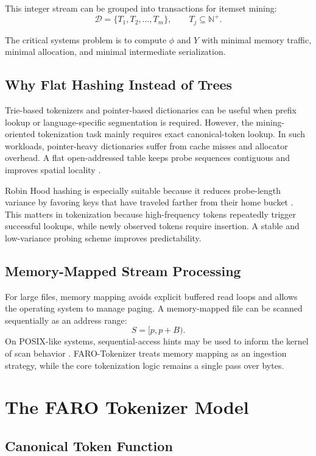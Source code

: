 \documentclass[11pt,a4paper]{article}
\newcommand{\D}{\mathcal{D}}
\begin{document}
This integer stream can be grouped into transactions for itemset mining:
\[
\D=\{T_1,T_2,\dots,T_m\},
\qquad
T_j\subseteq \mathbb{N}^+.
\]

The critical systems problem is to compute \(\phi\) and \(Y\) with minimal memory traffic, minimal allocation, and minimal intermediate serialization.

\subsection{Why Flat Hashing Instead of Trees}

Trie-based tokenizers and pointer-based dictionaries can be useful when prefix lookup or language-specific segmentation is required. However, the mining-oriented tokenization task mainly requires exact canonical-token lookup. In such workloads, pointer-heavy dictionaries suffer from cache misses and allocator overhead. A flat open-addressed table keeps probe sequences contiguous and improves spatial locality \cite{AskitisZobel2005,Bender2021LinearProbing}.

Robin Hood hashing is especially suitable because it reduces probe-length variance by favoring keys that have traveled farther from their home bucket \cite{Celis1986RobinHood,Mitzenmacher2014RobinHood}. This matters in tokenization because high-frequency tokens repeatedly trigger successful lookups, while newly observed tokens require insertion. A stable and low-variance probing scheme improves predictability.

\subsection{Memory-Mapped Stream Processing}

For large files, memory mapping avoids explicit buffered read loops and allows the operating system to manage paging. A memory-mapped file can be scanned sequentially as an address range:
\[
S = [p,p+B).
\]
On POSIX-like systems, sequential-access hints may be used to inform the kernel of scan behavior \cite{LinuxMmap,LinuxMadvise,LinuxFadvise}. FARO-Tokenizer treats memory mapping as an ingestion strategy, while the core tokenization logic remains a single pass over bytes.

\section{The FARO Tokenizer Model}

\subsection{Canonical Token Function}
\end{document}
